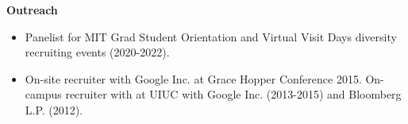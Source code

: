 \documentclass[centered,overlapped]{res}
\begin{document}
\begin{resume}
  \textbf{Outreach}
  \begin{itemize}  \itemsep -2pt
  \item Panelist for MIT Grad Student Orientation and Virtual Visit Days diversity recruiting events (2020-2022).
  \item On-site recruiter with Google Inc. at Grace Hopper Conference 2015. On-campus recruiter with at UIUC with Google Inc. (2013-2015) and Bloomberg L.P. (2012).
  \end{itemize}



\end{resume}
\end{document}
